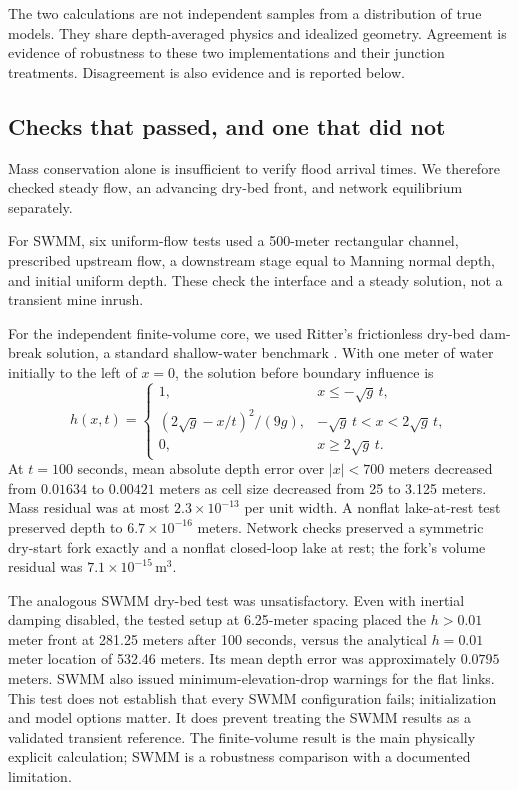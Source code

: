\documentclass[11pt]{article}
\begin{document}
The two calculations are not independent samples from a distribution of true models. They share depth-averaged physics and idealized geometry. Agreement is evidence of robustness to these two implementations and their junction treatments. Disagreement is also evidence and is reported below.

\subsection{Checks that passed, and one that did not}
Mass conservation alone is insufficient to verify flood arrival times. We therefore checked steady flow, an advancing dry-bed front, and network equilibrium separately.

For SWMM, six uniform-flow tests used a 500-meter rectangular channel, prescribed upstream flow, a downstream stage equal to Manning normal depth, and initial uniform depth. These check the interface and a steady solution, not a transient mine inrush.

For the independent finite-volume core, we used Ritter's frictionless dry-bed dam-break solution, a standard shallow-water benchmark \cite{swashes}. With one meter of water initially to the left of \(x=0\), the solution before boundary influence is
\[
 h(x,t)=
 \begin{cases}
 1,&x\leq-\sqrt g\,t,\\
 (2\sqrt g-x/t)^2/(9g),&-\sqrt g\,t<x<2\sqrt g\,t,\\
 0,&x\geq2\sqrt g\,t .
 \end{cases}
\]
At \(t=100\) seconds, mean absolute depth error over \(|x|<700\) meters decreased from \(0.01634\) to \(0.00421\) meters as cell size decreased from 25 to 3.125 meters. Mass residual was at most \(2.3\times10^{-13}\) per unit width. A nonflat lake-at-rest test preserved depth to \(6.7\times10^{-16}\) meters. Network checks preserved a symmetric dry-start fork exactly and a nonflat closed-loop lake at rest; the fork's volume residual was \(7.1\times10^{-15}\,\mathrm{m^3}\).

The analogous SWMM dry-bed test was unsatisfactory. Even with inertial damping disabled, the tested setup at 6.25-meter spacing placed the \(h>0.01\) meter front at 281.25 meters after 100 seconds, versus the analytical \(h=0.01\) meter location of 532.46 meters. Its mean depth error was approximately \(0.0795\) meters. SWMM also issued minimum-elevation-drop warnings for the flat links. This test does not establish that every SWMM configuration fails; initialization and model options matter. It does prevent treating the SWMM results as a validated transient reference. The finite-volume result is the main physically explicit calculation; SWMM is a robustness comparison with a documented limitation.
\end{document}
